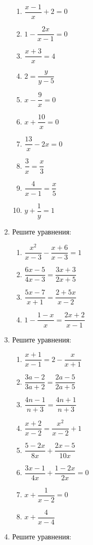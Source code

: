 \documentclass[10pt, a4paper]{article}
\begin{document}
\begin{enumerate}
\begin{multicols}{2}
		\begin{enumerate}[label=\asbuk*)]
			\item $\dfrac{x-1}{x}+2=0$
			\item $1-\dfrac{2x}{x-1}=0$
			\item $\dfrac{x+3}{x}=4$
			\item $2=\dfrac{y}{y-5}$
			\item $x-\dfrac{9}{x}=0$
			\item $x+\dfrac{10}{x}=0$
			\item $\dfrac{13}{x}-2x=0$
			\item $\dfrac{3}{x}=\dfrac{x}{3}$
			\item $\dfrac{4}{x-1}=\dfrac{x}{5}$
			\item $y+\dfrac{1}{y}=1$
		\end{enumerate}
	\end{multicols}
	\item Решите уравнения:
	\begin{multicols}{2}
		\begin{enumerate}[label=\asbuk*)]
			\item $\dfrac{x^2}{x-3}-\dfrac{x+6}{x-3}=1$
			\item $\dfrac{6x-5}{4x-3}=\dfrac{3x+3}{2x+5}$
			\item $\dfrac{5x-7}{x+1}=\dfrac{2+5x}{x-2}$
			\item $1-\dfrac{1-x}{x}=\dfrac{2x+2}{x-1}$
		\end{enumerate}
	\end{multicols}
	\item Решите уравнения:
	\begin{multicols}{2}
		\begin{enumerate}[label=\asbuk*)]
			\item $\dfrac{x+1}{x-1}=2-\dfrac{x}{x+1}$
			\item $\dfrac{3a-2}{3a+2}=\dfrac{2a-5}{2a+5}$
			\item $\dfrac{4n-1}{n+3}=\dfrac{4n+1}{n+3}$
			\item $\dfrac{x+2}{x-2}=\dfrac{x^2}{x-2}+1$
			\item $\dfrac{5-2x}{8x}+\dfrac{2x-5}{10x}$
			\item $\dfrac{3x-1}{4x}+\dfrac{1-2x}{2x}=0$
			\item $x+\dfrac{1}{x-2}=0$
			\item $x+\dfrac{4}{x-4}$
		\end{enumerate}
	\end{multicols}
	\item Решите уравнения:

\end{enumerate}
\end{document}
